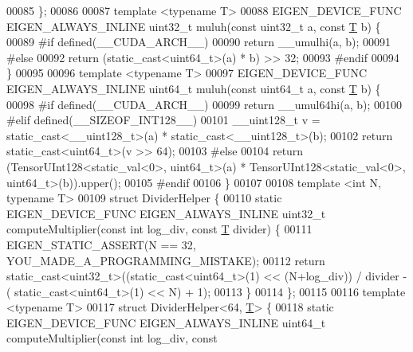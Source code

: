 \begin{DoxyCode}
00085   \};
00086 
00087   \textcolor{keyword}{template} <\textcolor{keyword}{typename} T>
00088   EIGEN\_DEVICE\_FUNC EIGEN\_ALWAYS\_INLINE uint32\_t muluh(\textcolor{keyword}{const} uint32\_t a, \textcolor{keyword}{const} \hyperlink{group___sparse_core___module_class_eigen_1_1_triplet}{T} b) \{
00089 \textcolor{preprocessor}{#if defined(\_\_CUDA\_ARCH\_\_)}
00090     \textcolor{keywordflow}{return} \_\_umulhi(a, b);
00091 \textcolor{preprocessor}{#else}
00092     \textcolor{keywordflow}{return} (static\_cast<uint64\_t>(a) * b) >> 32;
00093 \textcolor{preprocessor}{#endif}
00094   \}
00095 
00096   \textcolor{keyword}{template} <\textcolor{keyword}{typename} T>
00097   EIGEN\_DEVICE\_FUNC EIGEN\_ALWAYS\_INLINE uint64\_t muluh(\textcolor{keyword}{const} uint64\_t a, \textcolor{keyword}{const} \hyperlink{group___sparse_core___module_class_eigen_1_1_triplet}{T} b) \{
00098 \textcolor{preprocessor}{#if defined(\_\_CUDA\_ARCH\_\_)}
00099     \textcolor{keywordflow}{return} \_\_umul64hi(a, b);
00100 \textcolor{preprocessor}{#elif defined(\_\_SIZEOF\_INT128\_\_)}
00101     \_\_uint128\_t v = \textcolor{keyword}{static\_cast<}\_\_uint128\_t\textcolor{keyword}{>}(a) * static\_cast<\_\_uint128\_t>(b);
00102     \textcolor{keywordflow}{return} \textcolor{keyword}{static\_cast<}uint64\_t\textcolor{keyword}{>}(v >> 64);
00103 \textcolor{preprocessor}{#else}
00104     \textcolor{keywordflow}{return} (TensorUInt128<static\_val<0>, uint64\_t>(a) * TensorUInt128<static\_val<0>, uint64\_t>(b)).upper();
00105 \textcolor{preprocessor}{#endif}
00106   \}
00107 
00108   \textcolor{keyword}{template} <\textcolor{keywordtype}{int} N, \textcolor{keyword}{typename} T>
00109   \textcolor{keyword}{struct }DividerHelper \{
00110     \textcolor{keyword}{static} EIGEN\_DEVICE\_FUNC EIGEN\_ALWAYS\_INLINE uint32\_t computeMultiplier(\textcolor{keyword}{const} \textcolor{keywordtype}{int} log\_div, \textcolor{keyword}{const} 
      \hyperlink{group___sparse_core___module_class_eigen_1_1_triplet}{T} divider) \{
00111       EIGEN\_STATIC\_ASSERT(N == 32, YOU\_MADE\_A\_PROGRAMMING\_MISTAKE);
00112       \textcolor{keywordflow}{return} \textcolor{keyword}{static\_cast<}uint32\_t\textcolor{keyword}{>}((\textcolor{keyword}{static\_cast<}uint64\_t\textcolor{keyword}{>}(1) << (N+log\_div)) / divider - (
      static\_cast<uint64\_t>(1) << N) + 1);
00113     \}
00114   \};
00115 
00116   \textcolor{keyword}{template} <\textcolor{keyword}{typename} T>
00117   \textcolor{keyword}{struct }DividerHelper<64, \hyperlink{group___sparse_core___module_class_eigen_1_1_triplet}{T}> \{
00118     \textcolor{keyword}{static} EIGEN\_DEVICE\_FUNC EIGEN\_ALWAYS\_INLINE uint64\_t computeMultiplier(\textcolor{keyword}{const} \textcolor{keywordtype}{int} log\_div, \textcolor{keyword}{const} 

\end{DoxyCode}
